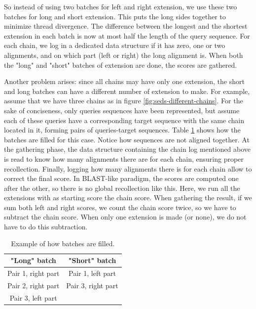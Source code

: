 So instead of using two batches for left and right extension, we use these two batches for long and short extension. This puts the long sides together to minimize thread divergence. The difference between the longest and the shortest extension in each batch is now at most half the length of the query sequence. For each chain, we log in a dedicated data structure if it has zero, one or two alignments, and on which part (left or right) the long alignment is. When both the "long" and "short" batches of extension are done, the scores are gathered.

Another problem arises: since all chains may have only one extension, the short and long batches can have a different number of extension to make. For example, assume that we have three chains as in figure \ref{fig:seds-different-chains}. For the sake of conciseness, only queries sequences have been represented, but assume each of these queries have a corresponding target sequence with the same chain located in it, forming pairs of queries-target sequences. Table \ref{tbl:batches} shows how the batches are filled for this case. Notice how sequences are not aligned together. At the gathering phase, the data structure containing the chain log mentioned above is read to know how many alignments there are for each chain, ensuring proper recollection. Finally, logging how many alignments there is for each chain allow to correct the final score. In BLAST-like paradigm, the scores are computed one after the other, so there is no global recollection like this. Here, we run all the extensions with as starting score the chain score. When gathering the result, if we sum both left and right scores, we count the chain score twice, so we have to subtract the chain score. When only one extension is made (or none), we do not have to do this subtraction.

\begin{table}
	\centering
	\begin{tabular}{|c|c|}
		\hline 
		\textbf{"Long" batch} & \textbf{"Short" batch} \\ 
		\hline 
		Pair 1, right part & Pair 1, left part \\ 
		\hline 
		Pair 2, right part & Pair 3, right part \\ 
		\hline 
		Pair 3, left part &  \\ 
		\hline 
	\end{tabular} 
	\caption{Example of how batches are filled.}
	\label{tbl:batches}
\end{table}

